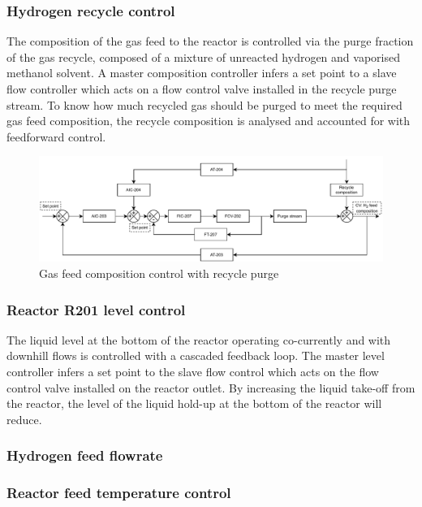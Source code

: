 \subsubsection{Hydrogen recycle control}%
The composition of the gas feed to the reactor is controlled via the purge fraction of the gas recycle, composed of a mixture of unreacted hydrogen and vaporised methanol solvent. A master composition controller infers a set point to a slave flow controller which acts on a flow control valve installed in the recycle purge stream. To know how much recycled gas should be purged to meet the required gas feed composition, the recycle composition is analysed and accounted for with feedforward control. 

\begin{figure}[H]
    \centering
    \includegraphics[width=0.8\linewidth]{chapters/4-operation-control/4-Figures/V202-CC.pdf}
    \caption{Gas feed composition control with recycle purge}
    \label{fig:V202-CC}
\end{figure}

\subsubsection{Reactor R201 level control} %
The liquid level at the bottom of the reactor operating co-currently and with downhill flows is controlled with a cascaded feedback loop. The master level controller infers a set point to the slave flow control which acts on the flow control valve installed on the reactor outlet. By increasing the liquid take-off from the reactor, the level of the liquid hold-up at the bottom of the reactor will reduce.


\subsubsection{Hydrogen feed flowrate} %








\subsubsection{Reactor feed temperature control}%



